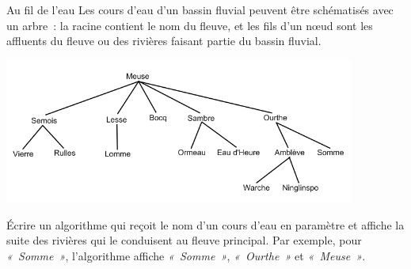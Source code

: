 			\begin{Exercice}{Au fil de l'eau}
				Les cours d'eau d'un bassin fluvial peuvent être schématisés 
				avec un arbre~: la racine contient le nom du fleuve, 
				et les fils d'un n{\oe}ud sont les affluents du fleuve 
				ou des rivières faisant partie du bassin fluvial.
				\begin{center}
				\includegraphics[width=11.529cm,height=4.768cm]{image/a2012Logique2eme-img040.png}
				\end{center}
				Écrire un algorithme qui reçoit le nom d'un cours d'eau 
				en paramètre et affiche la suite des rivières qui
				le conduisent au fleuve principal. Par exemple, 
				pour \textit{«~Somme~»}, l'algorithme affiche \textit{«~Somme~»}, 
				\textit{«~Ourthe~»} et \textit{«~Meuse~»}.
			\end{Exercice}
								